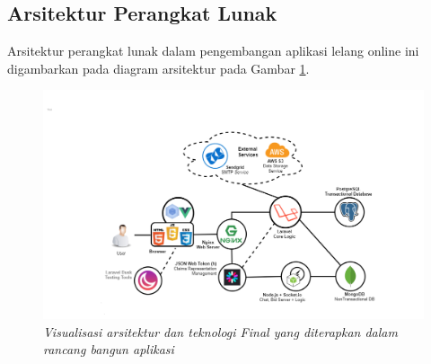
\subsection{Arsitektur Perangkat Lunak}
	\label{final-arch-tech}
	Arsitektur perangkat lunak dalam pengembangan aplikasi lelang online ini digambarkan pada diagram arsitektur pada Gambar \ref{final-arch-tech-figure}.
	\begin{landscape}
		\begin{figure}[]
			\centering
			\includegraphics[height=\textheight]{images/bab3/arsitektur-app.png}
			\caption{\textit{Visualisasi arsitektur dan teknologi Final yang diterapkan dalam rancang bangun aplikasi}}
			\label{final-arch-tech-figure}
		\end{figure}
	\end{landscape}
	
	
